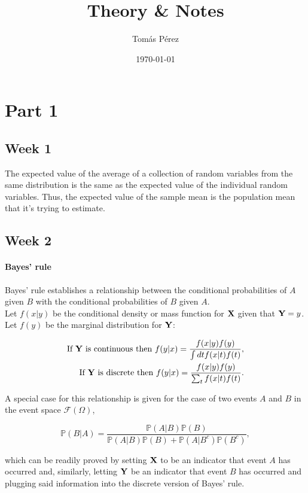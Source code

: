 \documentclass{homework}
\author{Tomás Pérez}
\date{\today}
\title{Theory \& Notes}
\begin{document}
 \maketitle

\section{Part 1}

\subsection{Week 1}

The expected value of the average of a collection of  random variables from the same distribution is the same as the expected value of the individual random variables. Thus, the expected value of the sample mean is the population mean that it's trying to estimate. 

\subsection{Week 2}

\paragraph{Bayes' rule}

Bayes' rule establishes a relationship between the conditional probabilities of $A$ given $B$ with the conditional probabilities of $B$ given $A$.\\

Let $f(x | y)$ be the conditional density or mass function for ${\bf X}$ given that ${\bf Y}=y$. Let $f(y)$ be the marginal distribution for ${\bf Y}$:

\begin{align*}
\textnormal{If } {\bf Y} \textnormal{ is continuous then }
f(y|x) = \frac{f(x|y)f(y)}{\int dt f(x|t)f(t)}, \\
\textnormal{If } {\bf Y} \textnormal{ is discrete then }
f(y|x) = \frac{f(x|y)f(y)}{\sum_{t} f(x|t)f(t)}.
\end{align*}

A special case for this relationship is given for the case of two events $A$ and $B$ in the event space $\mathcal{F}(\Omega)$, 

$$
\mathds{P}(B|A)= \frac{\mathds{P}(A|B)\mathds{P}(B)}{\mathds{P}(A|B)\mathds{P}(B)+\mathds{P}(A|B^c)\mathds{P}(B^c)},
$$

which can be readily proved by setting ${\bf X}$ to be an indicator that event $A$ has occurred and, similarly, letting ${\bf Y}$ be an indicator that event $B$ has occurred and plugging said information into the discrete version of Bayes' rule. \\
\end{document}
